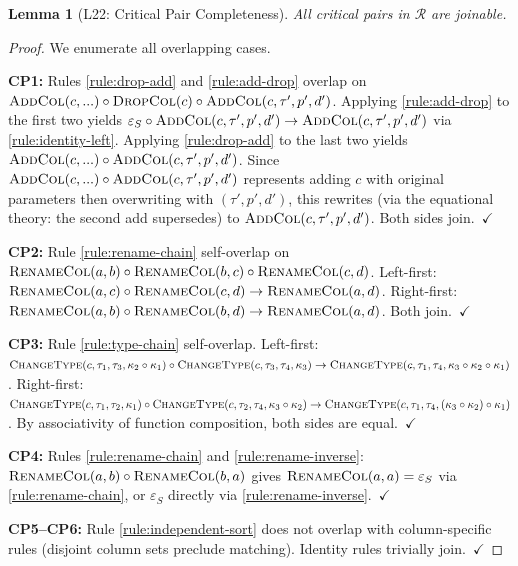 \documentclass[11pt,a4paper]{article}
\newtheorem{lemma}[theorem]{Lemma}
\theoremstyle{definition}
\newcommand{\epsS}{\varepsilon_S}
\begin{document}
\begin{lemma}[L22: Critical Pair Completeness]\label{lem:critical-pairs}
All critical pairs in $\mathcal{R}$ are joinable.
\end{lemma}

\begin{proof}
We enumerate all overlapping cases.

\textbf{CP1:} Rules \ref{rule:drop-add} and \ref{rule:add-drop} overlap on
$\textsc{AddCol}(c,...) \circ \textsc{DropCol}(c) \circ \textsc{AddCol}(c,\tau',p',d')$.
Applying \ref{rule:add-drop} to the first two yields
$\epsS \circ \textsc{AddCol}(c,\tau',p',d') \to \textsc{AddCol}(c,\tau',p',d')$
via \ref{rule:identity-left}.
Applying \ref{rule:drop-add} to the last two yields
$\textsc{AddCol}(c,...) \circ \textsc{AddCol}(c,\tau',p',d')$.
Since $\textsc{AddCol}(c,...) \circ \textsc{AddCol}(c,\tau',p',d')$ represents
adding $c$ with original parameters then overwriting with $(\tau',p',d')$,
this rewrites (via the equational theory: the second add supersedes) to
$\textsc{AddCol}(c,\tau',p',d')$.  Both sides join.~$\checkmark$

\textbf{CP2:} Rule \ref{rule:rename-chain} self-overlap on
$\textsc{RenameCol}(a,b) \circ \textsc{RenameCol}(b,c) \circ
\textsc{RenameCol}(c,d)$.
Left-first: $\textsc{RenameCol}(a,c) \circ \textsc{RenameCol}(c,d) \to
\textsc{RenameCol}(a,d)$.
Right-first: $\textsc{RenameCol}(a,b) \circ \textsc{RenameCol}(b,d) \to
\textsc{RenameCol}(a,d)$.  Both join.~$\checkmark$

\textbf{CP3:} Rule \ref{rule:type-chain} self-overlap.
Left-first: $\textsc{ChangeType}(c,\tau_1,\tau_3,\kappa_2 \circ \kappa_1) \circ
\textsc{ChangeType}(c,\tau_3,\tau_4,\kappa_3) \to
\textsc{ChangeType}(c,\tau_1,\tau_4,\kappa_3 \circ \kappa_2 \circ \kappa_1)$.
Right-first: $\textsc{ChangeType}(c,\tau_1,\tau_2,\kappa_1) \circ
\textsc{ChangeType}(c,\tau_2,\tau_4,\kappa_3 \circ \kappa_2) \to
\textsc{ChangeType}(c,\tau_1,\tau_4,(\kappa_3 \circ \kappa_2) \circ \kappa_1)$.
By associativity of function composition, both sides are equal.~$\checkmark$

\textbf{CP4:} Rules \ref{rule:rename-chain} and \ref{rule:rename-inverse}:
$\textsc{RenameCol}(a,b) \circ \textsc{RenameCol}(b,a)$ gives
$\textsc{RenameCol}(a,a) = \epsS$ via \ref{rule:rename-chain}, or $\epsS$
directly via \ref{rule:rename-inverse}.~$\checkmark$

\textbf{CP5--CP6:} Rule \ref{rule:independent-sort} does not overlap with
column-specific rules (disjoint column sets preclude matching).  Identity rules
trivially join.~$\checkmark$
\end{proof}
\end{document}
